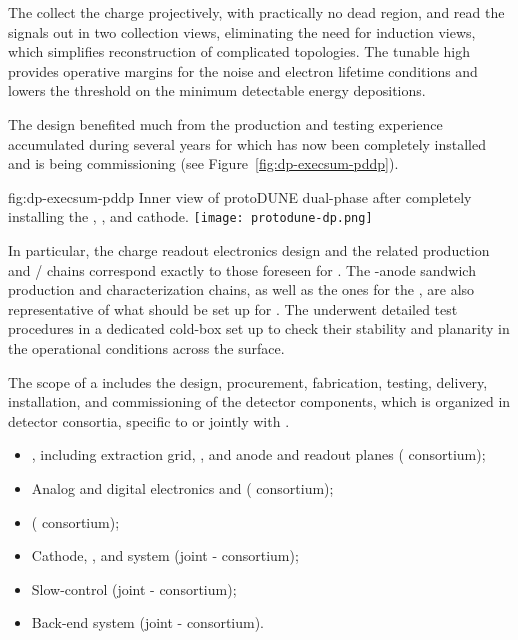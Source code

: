 The  collect the charge projectively,  with practically no dead region, and read the signals out  in two collection views, eliminating the need for  induction views,  which  simplifies reconstruction of complicated topologies. The tunable high  provides operative margins for the noise and electron lifetime conditions and lowers the threshold on the minimum detectable energy depositions.

The  design benefited much from the production and testing experience accumulated during several years for  which has now been completely installed and is being commissioning (see Figure~\ref{fig:dp-execsum-pddp}). 

\begin{dunefigure}{fig:dp-execsum-pddp}
  {Inner view of protoDUNE dual-phase after completely installing the , , and cathode.}
  \texttt{[image: protodune-dp.png]}
\end{dunefigure}

In particular, the charge readout electronics design and the related production and / chains correspond exactly to those foreseen for  . The -anode sandwich production and characterization chains, as well as the ones for the  ,  are also representative of what should be set up for  . The  underwent detailed test procedures in a dedicated cold-box set up to check their  stability and planarity in the operational conditions across the  surface.

The scope of a  includes the design, procurement, fabrication, testing, delivery, installation, and commissioning of the detector components, which is organized in detector consortia, specific to  or jointly with . 

\begin{itemize}
\item {}, including extraction grid, , and anode and readout planes ( consortium);
\item Analog and digital electronics and  ( consortium); 
\item {} ( consortium);
\item Cathode, , and  system (joint - consortium);  
\item Slow-control (joint - consortium); 
\item Back-end  system (joint - consortium).
\end{itemize}


